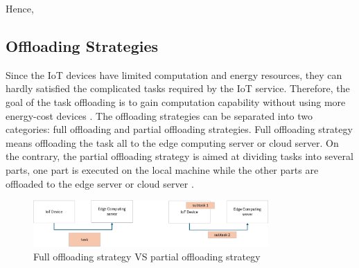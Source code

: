 \documentclass[a4paper,11pt]{article}
\begin{document}
Hence, 



\subsection{Offloading Strategies}
Since the IoT devices have limited computation and energy resources, they can hardly satisfied the complicated tasks required by the IoT service. Therefore, the goal of the task offloading is to gain computation capability without using more energy-cost devices \cite{aim_offloading}. The offloading strategies can be separated into two categories: full offloading and partial offloading strategies. Full offloading strategy means offloading the task all to the edge computing server or cloud server. On the contrary, the partial offloading strategy is aimed at dividing tasks into several parts, one part is executed on the local machine while the other parts are offloaded to the edge server or cloud server \cite{full_partial}. 

\begin{figure}[h]
        \centering
        \includegraphics[width=0.8\textwidth]{offloading.png}
        \caption{Full offloading strategy VS partial offloading strategy}
\end{figure}
\end{document}
